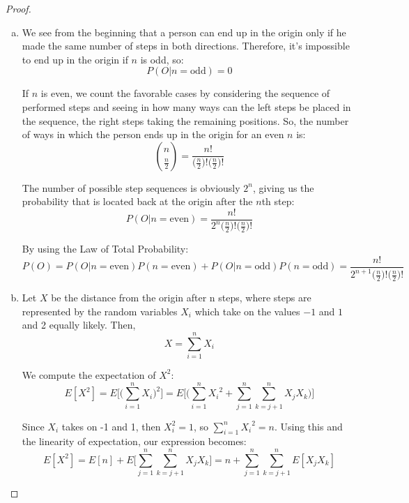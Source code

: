 \vspace{1em}

\begin{proof}
    \hfill
    \begin{enumerate}[(a)]
        \item We see from the beginning that a person can end up in the origin only
            if he made the same number of steps in both directions. Therefore, it's
            impossible to end up in the origin if $n$ is odd, so: 
            \[
                P(O | n = \text{odd}) = 0
            \] 

            If $n$ is even, we
            count the favorable cases by considering the sequence of performed steps
            and seeing in how many ways can the left steps be placed in the sequence,
            the right steps taking the remaining positions. So, the number
            of ways in which the person ends up in the origin for an even $n$ is:
             \[
                 \binom{n}{\frac{n}{2}} = \frac{n!}{\big(\frac{n}{2}\big)!\big(\frac{n}{2}\big)!}
            \] 

            The number of possible step sequences is obviously $2^n$, giving us the 
            probability that is located back at the origin after the $n$th step:
            \[
                P(O | n = \text{even}) = \frac{n!}{2^n\big(\frac{n}{2}\big)!\big(\frac{n}{2}\big)!}
            \] 

            By using the Law of Total Probability:
            \[
                P(O) = P(O | n = \text{even})P(n = \text{even}) + P(O | n = \text{odd})P(n = \text{odd}) 
                = \frac{n!}{2^{n+1}\big(\frac{n}{2}\big)!\big(\frac{n}{2}\big)!}
            \] 

        \item Let $X$ be the distance from the origin after n steps, where steps are represented
            by the random variables $X_i$ which take on the values $-1$ and $1$ and 2 equally likely. Then,
            \[
                X = \sum_{i = 1}^{n} X_i
            \] 

            We compute the expectation of $X^2$:
            \[
                E[X^2] = E\bigg[\bigg(\sum_{i = 1}^n X_i\bigg)^2\bigg] 
                = E\bigg[\bigg(\sum_{i = 1}^n {X_i}^2 + \sum_{j = 1}^n\sum_{k = j+1}^n X_jX_k\bigg)\bigg]
            \] 

            Since $X_i$ takes on -1 and 1, then $X_i^2 = 1$, so $\displaystyle \sum_{i = 1}^n {X_i}^2 = n$.
            Using this and the linearity of expectation, our expression becomes:
            \[
                E[X^2] = E[n] + E\bigg[\sum_{j = 1}^n\sum_{k = j+1}^n X_jX_k\bigg]
                = n + \sum_{j = 1}^n\sum_{k = j+1}^n E[X_jX_k]
            \] 


\end{enumerate}
\end{proof}
